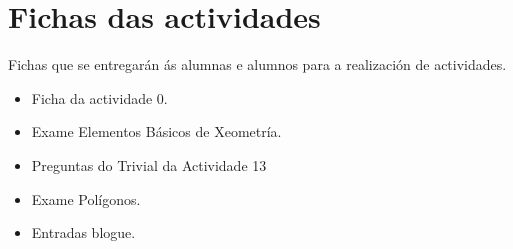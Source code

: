 

\chapter{Fichas das actividades}\label{chap:fich-act}

Fichas que se entregarán ás alumnas e alumnos para a realización de actividades.
\begin{itemize}
  \item Ficha da actividade 0.
  \item Exame Elementos Básicos de Xeometría.
  \item Preguntas do Trivial da Actividade 13
  \item Exame Polígonos.
  \item Entradas blogue.
\end{itemize}
\newpage














